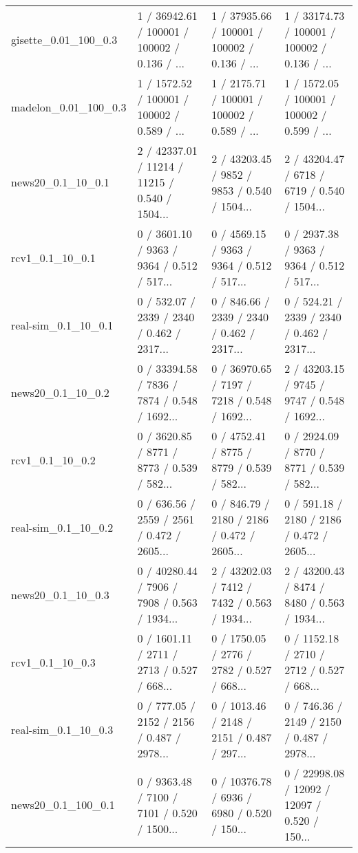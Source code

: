 \begin{tabular}{llll}
      gisette\_0.01\_100\_0.3 &  1 / 36942.61 / 100001 /  100002 / 0.136 /     ... &  1 / 37935.66 / 100001 /  100002 / 0.136 /     ... &  1 / 33174.73 / 100001 /  100002 / 0.136 /     ... \\
      madelon\_0.01\_100\_0.3 &  1 / 1572.52 / 100001 /  100002 / 0.589 /      ... &  1 / 2175.71 / 100001 /  100002 / 0.589 /      ... &  1 / 1572.05 / 100001 /  100002 / 0.599 /      ... \\
         news20\_0.1\_10\_0.1 &  2 / 42337.01 /  11214 /   11215 / 0.540 / 1504... &  2 / 43203.45 /   9852 /    9853 / 0.540 / 1504... &  2 / 43204.47 /   6718 /    6719 / 0.540 / 1504... \\
           rcv1\_0.1\_10\_0.1 &  0 / 3601.10 /   9363 /    9364 / 0.512 /   517... &  0 / 4569.15 /   9363 /    9364 / 0.512 /   517... &  0 / 2937.38 /   9363 /    9364 / 0.512 /   517... \\
       real-sim\_0.1\_10\_0.1 &  0 / 532.07 /   2339 /    2340 / 0.462 /   2317... &  0 / 846.66 /   2339 /    2340 / 0.462 /   2317... &  0 / 524.21 /   2339 /    2340 / 0.462 /   2317... \\
         news20\_0.1\_10\_0.2 &  0 / 33394.58 /   7836 /    7874 / 0.548 / 1692... &  0 / 36970.65 /   7197 /    7218 / 0.548 / 1692... &  2 / 43203.15 /   9745 /    9747 / 0.548 / 1692... \\
           rcv1\_0.1\_10\_0.2 &  0 / 3620.85 /   8771 /    8773 / 0.539 /   582... &  0 / 4752.41 /   8775 /    8779 / 0.539 /   582... &  0 / 2924.09 /   8770 /    8771 / 0.539 /   582... \\
       real-sim\_0.1\_10\_0.2 &  0 / 636.56 /   2559 /    2561 / 0.472 /   2605... &  0 / 846.79 /   2180 /    2186 / 0.472 /   2605... &  0 / 591.18 /   2180 /    2186 / 0.472 /   2605... \\
         news20\_0.1\_10\_0.3 &  0 / 40280.44 /   7906 /    7908 / 0.563 / 1934... &  2 / 43202.03 /   7412 /    7432 / 0.563 / 1934... &  2 / 43200.43 /   8474 /    8480 / 0.563 / 1934... \\
           rcv1\_0.1\_10\_0.3 &  0 / 1601.11 /   2711 /    2713 / 0.527 /   668... &  0 / 1750.05 /   2776 /    2782 / 0.527 /   668... &  0 / 1152.18 /   2710 /    2712 / 0.527 /   668... \\
       real-sim\_0.1\_10\_0.3 &  0 / 777.05 /   2152 /    2156 / 0.487 /   2978... &  0 / 1013.46 /   2148 /    2151 / 0.487 /   297... &  0 / 746.36 /   2149 /    2150 / 0.487 /   2978... \\
        news20\_0.1\_100\_0.1 &  0 / 9363.48 /   7100 /    7101 / 0.520 /  1500... &  0 / 10376.78 /   6936 /    6980 / 0.520 /  150... &  0 / 22998.08 /  12092 /   12097 / 0.520 /  150... \\

\end{tabular}

